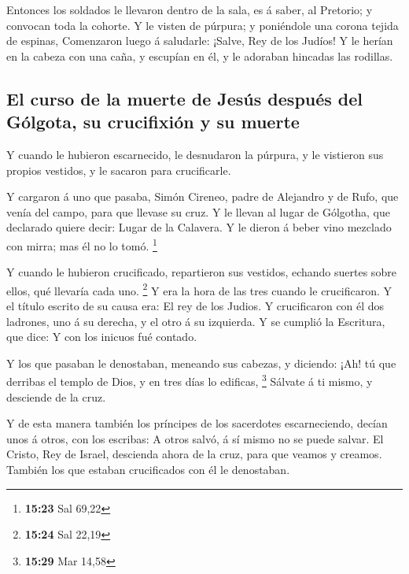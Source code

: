  Entonces los soldados le llevaron dentro de la sala, es á
saber, al Pretorio; y convocan toda la cohorte.  Y le
visten de púrpura; y poniéndole una corona tejida de espinas,
 Comenzaron luego á saludarle: ¡Salve, Rey de los Judíos!
 Y le herían en la cabeza con una caña, y escupían en él, y
le adoraban hincadas las rodillas.

\hypertarget{el-curso-de-la-muerte-de-jesuxfas-despuuxe9s-del-guxf3lgota-su-crucifixiuxf3n-y-su-muerte}{%
\subsection{El curso de la muerte de Jesús después del Gólgota, su
crucifixión y su
muerte}\label{el-curso-de-la-muerte-de-jesuxfas-despuuxe9s-del-guxf3lgota-su-crucifixiuxf3n-y-su-muerte}}

 Y cuando le hubieron escarnecido, le desnudaron la
púrpura, y le vistieron sus propios vestidos, y le sacaron para
crucificarle.

 Y cargaron á uno que pasaba, Simón Cireneo, padre de
Alejandro y de Rufo, que venía del campo, para que llevase su cruz.
 Y le llevan al lugar de Gólgotha, que declarado quiere
decir: Lugar de la Calavera.  Y le dieron á beber vino
mezclado con mirra; mas él no lo tomó. \footnote{\textbf{15:23} Sal
  69,22}

 Y cuando le hubieron crucificado, repartieron sus
vestidos, echando suertes sobre ellos, qué llevaría cada uno.
\footnote{\textbf{15:24} Sal 22,19}  Y era la hora de las
tres cuando le crucificaron.  Y el título escrito de su
causa era: El rey de los Judios.  Y crucificaron con él dos
ladrones, uno á su derecha, y el otro á su izquierda.  Y se
cumplió la Escritura, que dice: Y con los inicuos fué contado.

 Y los que pasaban le denostaban, meneando sus cabezas, y
diciendo: ¡Ah! tú que derribas el templo de Dios, y en tres días lo
edificas, \footnote{\textbf{15:29} Mar 14,58}  Sálvate á ti
mismo, y desciende de la cruz.

 Y de esta manera también los príncipes de los sacerdotes
escarneciendo, decían unos á otros, con los escribas: A otros salvó, á
sí mismo no se puede salvar.  El Cristo, Rey de Israel,
descienda ahora de la cruz, para que veamos y creamos. También los que
estaban crucificados con él le denostaban.

